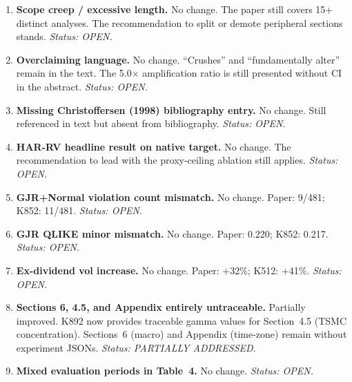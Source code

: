 \documentclass[12pt,a4paper]{article}
\begin{document}
\begin{enumerate}[label=\textcolor{warncolor}{M\arabic*}]

\item \textbf{Scope creep / excessive length.} \textcolor{warncolor}{No change.} The paper still covers 15+ distinct analyses. The recommendation to split or demote peripheral sections stands. \textit{Status: OPEN.}

\item \textbf{Overclaiming language.} \textcolor{warncolor}{No change.} ``Crushes'' and ``fundamentally alter'' remain in the text. The 5.0$\times$ amplification ratio is still presented without CI in the abstract. \textit{Status: OPEN.}

\item \textbf{Missing Christoffersen (1998) bibliography entry.} \textcolor{warncolor}{No change.} Still referenced in text but absent from bibliography. \textit{Status: OPEN.}

\item \textbf{HAR-RV headline result on native target.} \textcolor{warncolor}{No change.} The recommendation to lead with the proxy-ceiling ablation still applies. \textit{Status: OPEN.}

\item \textbf{GJR+Normal violation count mismatch.} \textcolor{warncolor}{No change.} Paper: 9/481; K852: 11/481. \textit{Status: OPEN.}

\item \textbf{GJR QLIKE minor mismatch.} \textcolor{warncolor}{No change.} Paper: 0.220; K852: 0.217. \textit{Status: OPEN.}

\item \textbf{Ex-dividend vol increase.} \textcolor{warncolor}{No change.} Paper: +32\%; K512: +41\%. \textit{Status: OPEN.}

\item \textbf{Sections 6, 4.5, and Appendix entirely untraceable.} \textcolor{warncolor}{Partially improved.} K892 now provides traceable gamma values for Section~4.5 (TSMC concentration). Sections~6 (macro) and Appendix (time-zone) remain without experiment JSONs. \textit{Status: PARTIALLY ADDRESSED.}

\item \textbf{Mixed evaluation periods in Table~4.} \textcolor{warncolor}{No change.} \textit{Status: OPEN.}

\end{enumerate}


\end{document}
